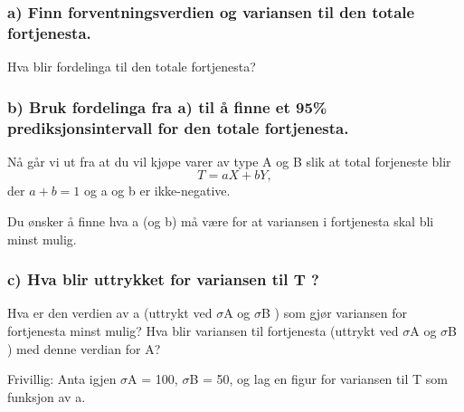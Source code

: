 \documentclass[
  12pt,
  a4paper,
  DIV=11,
  numbers=noendperiod]{scrartcl}
\begin{document}
\subsubsection{a) Finn forventningsverdien og variansen til den totale
fortjenesta.}\label{a-finn-forventningsverdien-og-variansen-til-den-totale-fortjenesta.}

Hva blir fordelinga til den totale fortjenesta?

\subsubsection{b) Bruk fordelinga fra a) til å finne et 95\%
prediksjonsintervall for den totale
fortjenesta.}\label{b-bruk-fordelinga-fra-a-til-uxe5-finne-et-95-prediksjonsintervall-for-den-totale-fortjenesta.}

Nå går vi ut fra at du vil kjøpe varer av type A og B slik at total
forjeneste blir \[
T = aX + bY,
\] der \(a + b = 1\) og a og b er ikke-negative.

Du ønsker å finne hva a (og b) må være for at variansen i fortjenesta
skal bli minst mulig.

\subsubsection{c) Hva blir uttrykket for variansen til T
?}\label{c-hva-blir-uttrykket-for-variansen-til-t}

Hva er den verdien av a (uttrykt ved \(\sigma\)A og \(\sigma\)B ) som
gjør variansen for fortjenesta minst mulig? Hva blir variansen til
fortjenesta (uttrykt ved \(\sigma\)A og \(\sigma\)B ) med denne verdian
for A?

Frivillig: Anta igjen \(\sigma\)A = 100, \(\sigma\)B = 50, og lag en
figur for variansen til T som funksjon av a.
\end{document}
